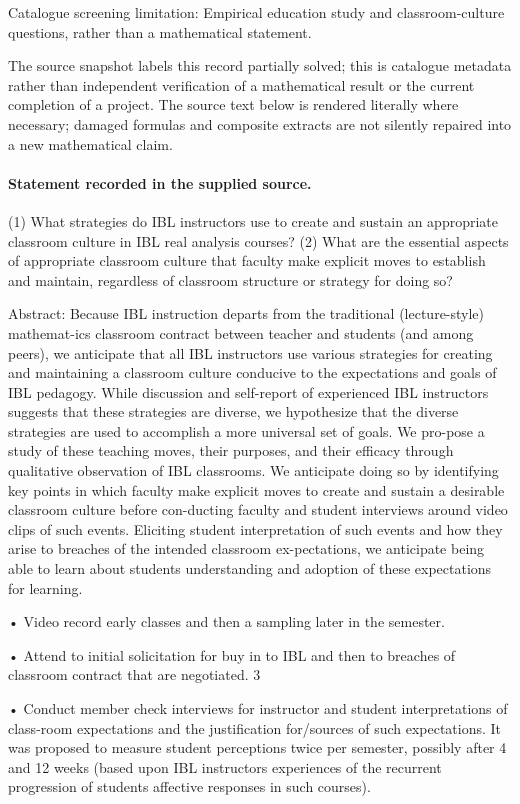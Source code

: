 \documentclass[11pt]{article}
\begin{document}
Catalogue screening limitation: Empirical education study and classroom-culture questions, rather than a mathematical statement.

The source snapshot labels this record partially solved; this is catalogue metadata rather than independent verification of a mathematical result or the current completion of a project.
The source text below is rendered literally where necessary; damaged formulas and composite extracts are not silently repaired into a new mathematical claim.
\paragraph{Statement recorded in the supplied source.}
(1) What strategies do IBL instructors use to create and sustain an appropriate classroom culture in IBL real analysis courses? (2) What are the essential aspects of appropriate classroom culture that faculty make explicit moves to establish and maintain, regardless of classroom structure or strategy for doing so?

Abstract: Because IBL instruction departs from the traditional (lecture-style) mathemat-ics classroom contract between teacher and students (and among peers), we anticipate that all IBL instructors use various strategies for creating and maintaining a classroom culture conducive to the expectations and goals of IBL pedagogy. While discussion and self-report of experienced IBL instructors suggests that these strategies are diverse, we hypothesize that the diverse strategies are used to accomplish a more universal set of goals. We pro-pose a study of these teaching moves, their purposes, and their efficacy through qualitative observation of IBL classrooms. We anticipate doing so by identifying key points in which faculty make explicit moves to create and sustain a desirable classroom culture before con-ducting faculty and student interviews around video clips of such events. Eliciting student interpretation of such events and how they arise to breaches of the intended classroom ex-pectations, we anticipate being able to learn about students understanding and adoption of these expectations for learning.

• Video record early classes and then a sampling later in the semester.

• Attend to initial solicitation for buy in to IBL and then to breaches of classroom contract that are negotiated. 3

• Conduct member check interviews for instructor and student interpretations of class-room expectations and the justification for/sources of such expectations. It was proposed to measure student perceptions twice per semester, possibly after 4 and 12 weeks (based upon IBL instructors experiences of the recurrent progression of students affective responses in such courses).
\end{document}
